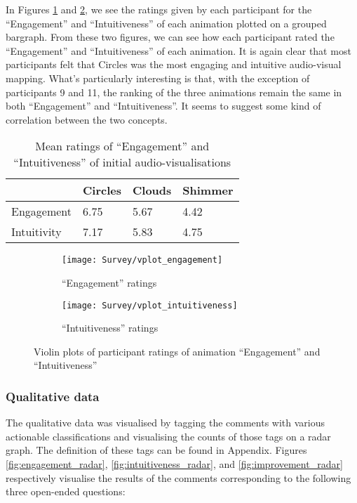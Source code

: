 \documentclass[../initial_thesis.tex]{subfiles}
\begin{document}
In Figures \ref{fig:engagement_ratings} and \ref{fig:intuitive_ratings}, we see the ratings given by each participant for the ``Engagement'' and ``Intuitiveness'' of each animation plotted on a grouped bargraph. From these two figures, we can see how each participant rated the ``Engagement'' and ``Intuitiveness'' of each animation. It is again clear that most participants felt that Circles was the most engaging and intuitive audio-visual mapping. What's particularly interesting is that, with the exception of participants 9 and 11, the ranking of the three animations remain the same in both ``Engagement'' and ``Intuitiveness''. It seems to suggest some kind of correlation between the two concepts.

\begin{table}[]
  \centering
\begin{tabular}{|l|l|l|l|}
\hline
\rowcolor[HTML]{FFCE93} 
            & Circles & Clouds & Shimmer \\ \hline
Engagement  & 6.75    & 5.67   & 4.42    \\ \hline
Intuitivity & 7.17    & 5.83   & 4.75    \\ \hline
\end{tabular}
\caption{Mean ratings of ``Engagement'' and ``Intuitiveness'' of initial audio-visualisations}
\label{tab:meantable}
\end{table}

\begin{figure}
  \begin{subfigure}{0.5\textwidth}
    \centering
    \texttt{[image: Survey/vplot\_engagement]}
    \caption{``Engagement'' ratings}
    \label{fig:engagement_ratings}
  \end{subfigure}
  \begin{subfigure}{0.5\textwidth}
    \centering
    \texttt{[image: Survey/vplot\_intuitiveness]}
    \caption{``Intuitiveness'' ratings}
    \label{fig:intuitive_ratings}
  \end{subfigure}
  \caption{Violin plots of participant ratings of animation ``Engagement'' and ``Intuitiveness''}
  \label{fig:vplot_ratings}
\end{figure}

\subsubsection{Qualitative data}
The qualitative data was visualised by tagging the comments with various actionable classifications and visualising the counts of those tags on a radar graph. The definition of these tags can be found in Appendix. %
Figures \ref{fig:engagement_radar}, \ref{fig:intuitiveness_radar}, and \ref{fig:improvement_radar} respectively visualise the results of the comments corresponding to the following three open-ended questions:
\end{document}
